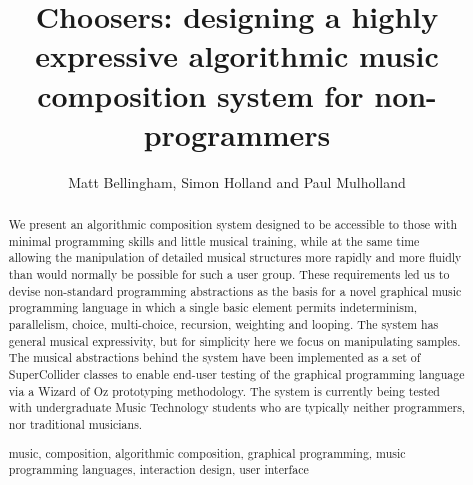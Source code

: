 \documentclass[runningheads,a4paper]{llncs}
\newcommand{\keywords}[1]{\par\addvspace\baselineskip
\noindent\keywordname\enspace\ignorespaces#1}
\begin{document}
\mainmatter  %

\title{Choosers: designing a highly expressive algorithmic music composition system for non-programmers}


%
%
\author{Matt Bellingham, Simon Holland and Paul Mulholland}
%


%
%


\maketitle


\begin{abstract}

We present an algorithmic composition system designed to be accessible to those with minimal programming skills and little musical training, while at the same time allowing the manipulation of detailed musical structures more rapidly and more fluidly than would normally be possible for such a user group. These requirements led us to devise non-standard programming abstractions as the basis for a novel graphical music programming language in which a single basic element permits indeterminism, parallelism, choice, multi-choice, recursion, weighting and looping. The system has general musical expressivity, but for simplicity here we focus on manipulating samples. The musical abstractions behind the system have been implemented as a set of SuperCollider classes to enable end-user testing of the graphical programming language via a Wizard of Oz prototyping methodology. The system is currently being tested with undergraduate Music Technology students who are typically neither programmers, nor traditional musicians.


\keywords{music, composition, algorithmic composition, graphical programming, music programming languages, interaction design, user interface}

\end{abstract}
\end{document}
